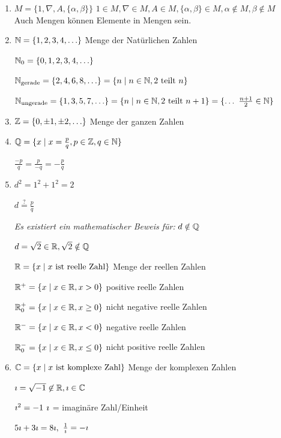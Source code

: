 \begin{enumerate}
	\item $M=\{1,\nabla,A,\{\alpha,\beta\}\}$ $1\in M, \nabla \in M, A\in M, \{\alpha, \beta\} \in M, \alpha \notin M, \beta \notin M$\\
	Auch Mengen können Elemente in Mengen sein.
	
	\item $\mathbb{N} = \{1,2,3,4,\ldots\}$ Menge der Natürlichen Zahlen
	
	$\mathbb{N}_0=\{0,1,2,3,4,\ldots\}$
	
	$\mathbb{N}_\text{gerade} = \{2,4,6,8,\ldots\} = \{n\mid n\in \mathbb{N}, 2\text{ teilt }n\}$
	
	$\mathbb{N}_\text{ungerade} = \{1,3,5,7,\ldots\} = \{n\mid n\in \mathbb{N}, 2\text{ teilt }n+1\} = \{\ldots\ \frac{n+1}{2} \in \mathbb{N}\}$
	
	\item $\mathbb{Z}=\{0,\pm 1,\pm 2,\ldots\}$ Menge der ganzen Zahlen
	
	\item $\mathbb{Q}=\{x\mid x=\frac{p}{q}, p\in \mathbb{Z}, q\in \mathbb{N}\}$
	
	\Beachte $\frac{-p}{q}=\frac{p}{-q}=-\frac{p}{q}$
	
	\item $d^2 =1^2+1^2 = 2$
	
	$d\stackrel{?}{=}\frac{p}{q}$
	
	\emph{Es existiert ein mathematischer Beweis für:} $d\notin \mathbb{Q}$
	
	$d=\sqrt{2}\in \mathbb{R}, \sqrt{2}\notin \mathbb{Q}$
	
	$\mathbb{R}=\{x\mid x\text{ ist reelle Zahl}\}$ Menge der reellen Zahlen
	
	$\mathbb{R}^+=\{x\mid x\in \mathbb{R}, x>0\}$ positive reelle Zahlen

	$\mathbb{R}_0^+=\{x\mid x\in \mathbb{R}, x\ge 0\}$ nicht negative reelle Zahlen
	
	$\mathbb{R}^-=\{x\mid x\in \mathbb{R}, x<0\}$ negative reelle Zahlen
	
	$\mathbb{R}_0^-=\{x\mid x\in \mathbb{R}, x\le 0\}$ nicht positive reelle Zahlen
	
	\item $\mathbb{C}=\{x\mid x\text{ ist komplexe Zahl}\}$ Menge der komplexen Zahlen
	
	$\imath = \sqrt{-1} \not\in \mathbb{R}, \imath \in \mathbb{C}$
	
	$\imath^2 = -1$ \qquad$\imath$ = imaginäre Zahl/Einheit
	
	$5\imath+3\imath=8\imath,$ \qquad$\frac{1}{\imath}=-\imath$
\end{enumerate}


